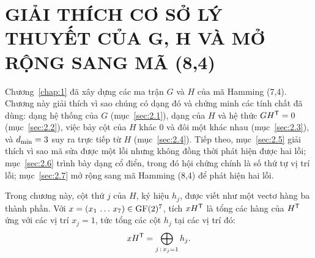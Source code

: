 \chapter{GIẢI THÍCH CƠ SỞ LÝ THUYẾT CỦA G, H VÀ MỞ RỘNG SANG MÃ (8,4)}
\label{chap:2}

Chương~\ref{chap:1} đã xây dựng các ma trận $G$ và $H$ của mã Hamming (7,4). Chương
này giải thích vì sao chúng có dạng đó và chứng minh các tính chất đã dùng:
dạng hệ thống của $G$ (mục~\ref{sec:2.1}), dạng của $H$ và hệ thức
$GH^{\mathsf{T}} = 0$ (mục~\ref{sec:2.2}), việc bảy cột của $H$ khác $0$ và đôi một khác
nhau (mục~\ref{sec:2.3}), và $d_{\min} = 3$ suy ra trực tiếp từ $H$
(mục~\ref{sec:2.4}). Tiếp theo, mục~\ref{sec:2.5} giải thích vì sao mã sửa
được một lỗi nhưng không đồng thời phát hiện được hai lỗi; mục~\ref{sec:2.6}
trình bày dạng cổ điển, trong đó hội chứng chính là số thứ tự vị trí lỗi;
mục~\ref{sec:2.7} mở rộng sang mã Hamming (8,4) để phát hiện hai lỗi.

Trong chương này, cột thứ $j$ của $H$, ký hiệu $h_j$, được viết như một vectơ
hàng ba thành phần. Với $x = (x_1\,\dots\,x_7) \in \mathrm{GF}(2)^{7}$, tích $xH^{\mathsf{T}}$ là
tổng các hàng của $H^{\mathsf{T}}$ ứng với các vị trí $x_j = 1$, tức tổng các cột $h_j$
tại các vị trí đó:
\begin{equation}\label{eq:tongcot}
  xH^{\mathsf{T}} = \bigoplus_{j\,:\,x_j = 1} h_j .
\end{equation}

